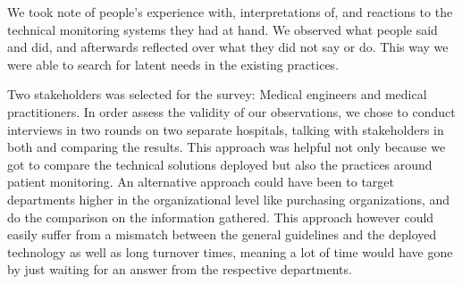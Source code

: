 We took note of people's experience with, interpretations of, and reactions to the technical monitoring systems they had at hand. We observed what people said and did, and afterwards reflected over what they did not say or do. This way we were able to search for latent needs in the existing practices. 

Two stakeholders was selected for the survey: Medical engineers and medical practitioners. In order assess the validity of our observations, we chose to conduct interviews in two rounds on two separate hospitals, talking with stakeholders in both and comparing the results. This approach was helpful not only because we got to compare the technical solutions deployed but also the practices around patient monitoring. An alternative approach could have been to target departments higher in the organizational level like purchasing organizations, and do the comparison on the information gathered. This approach however could easily suffer from a mismatch between the general guidelines and the deployed technology as well as long turnover times, meaning a lot of time would have gone by just waiting for an answer from the respective departments.



